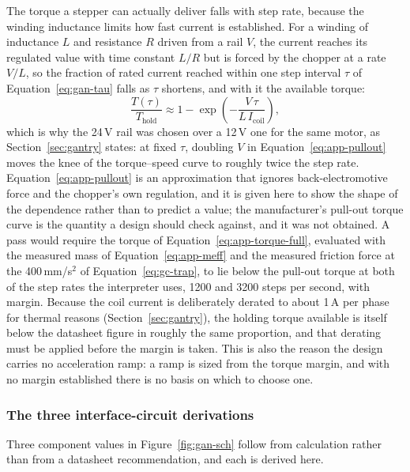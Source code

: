 The torque a stepper can actually deliver falls with step rate, because the winding inductance limits how fast current is established.
For a winding of inductance $L$ and resistance $R$ driven from a rail $V$, the current reaches its regulated value with time constant $L/R$ but is forced by the chopper at a rate $V/L$, so the fraction of rated current reached within one step interval $\tau$ of Equation~\ref{eq:gan-tau} falls as $\tau$ shortens, and with it the available torque:
\begin{equation}
\frac{T(\tau)}{T_{\mathrm{hold}}}\approx 1-\exp\!\left(-\frac{V\,\tau}{L\,I_{\mathrm{coil}}}\right),
\label{eq:app-pullout}
\end{equation}
which is why the 24\,V rail was chosen over a 12\,V one for the same motor, as Section~\ref{sec:gantry} states: at fixed $\tau$, doubling $V$ in Equation~\ref{eq:app-pullout} moves the knee of the torque--speed curve to roughly twice the step rate.
Equation~\ref{eq:app-pullout} is an approximation that ignores back-electromotive force and the chopper's own regulation, and it is given here to show the shape of the dependence rather than to predict a value; the manufacturer's pull-out torque curve is the quantity a design should check against, and it was not obtained.
A pass would require the torque of Equation~\ref{eq:app-torque-full}, evaluated with the measured mass of Equation~\ref{eq:app-meff} and the measured friction force at the 400\,mm/s$^2$ of Equation~\ref{eq:gc-trap}, to lie below the pull-out torque at both of the step rates the interpreter uses, 1200 and 3200 steps per second, with margin.
Because the coil current is deliberately derated to about 1\,A per phase for thermal reasons (Section~\ref{sec:gantry}), the holding torque available is itself below the datasheet figure in roughly the same proportion, and that derating must be applied before the margin is taken.
This is also the reason the design carries no acceleration ramp: a ramp is sized from the torque margin, and with no margin established there is no basis on which to choose one.

\subsubsection{The three interface-circuit derivations}

Three component values in Figure~\ref{fig:gan-sch} follow from calculation rather than from a datasheet recommendation, and each is derived here.

